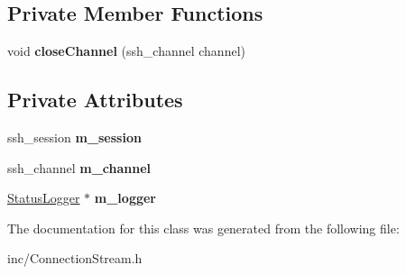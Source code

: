 \subsection*{Private Member Functions}
\begin{DoxyCompactItemize}
\item 
\mbox{\label{classConnectionStream_a42f6169f1228c0f690d385fc5a278965}} 
void {\bfseries close\+Channel} (ssh\+\_\+channel channel)
\end{DoxyCompactItemize}
\subsection*{Private Attributes}
\begin{DoxyCompactItemize}
\item 
\mbox{\label{classConnectionStream_a0c3d09410dad1e406954bb61fd9d64b9}} 
ssh\+\_\+session {\bfseries m\+\_\+session}
\item 
\mbox{\label{classConnectionStream_a63c356309a1cfa4ac04f7dc5b2c08fa0}} 
ssh\+\_\+channel {\bfseries m\+\_\+channel}
\item 
\mbox{\label{classConnectionStream_a34222df0c29e871cf31b44c53fdc017a}} 
\hyperlink{classStatusLogger}{Status\+Logger} $\ast$ {\bfseries m\+\_\+logger}
\end{DoxyCompactItemize}


The documentation for this class was generated from the following file\+:\begin{DoxyCompactItemize}
\item 
inc/Connection\+Stream.\+h\end{DoxyCompactItemize}
